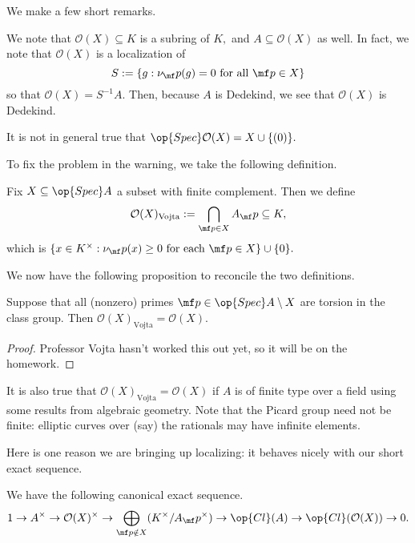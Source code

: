 \documentclass[../notes.tex]{subfiles}
\begin{document}
We make a few short remarks.
\begin{remark}
    We note that $\mathcal O(X)\subseteq K$ is a subring of $K,$ and $A\subseteq\mathcal O(X)$ as well. In fact, we note that $\mathcal O(X)$ is a localization of
    \[S:=\{g:\nu_\mf p(g)=0\text{ for all }\mf p\in X\}\]
    so that $\mathcal O(X)=S^{-1}A.$ Then, because $A$ is Dedekind, we see that $\mathcal O(X)$ is Dedekind.
\end{remark}
\begin{warn}
    It is not in general true that $\op{Spec}\mathcal O(X)=X\cup\{(0)\}.$
\end{warn}
To fix the problem in the warning, we take the following definition.
\begin{definition}
    Fix $X\subseteq\op{Spec}A$ a subset with finite complement. Then we define
    \[\mathcal O(X)_{\text{Vojta}}:=\bigcap_{\mf p\in X}A_\mf p\subseteq K,\]
    which is $\{x\in K^\times:\nu_\mf p(x)\ge0\text{ for each }\mf p\in X\}\cup\{0\}.$
\end{definition}
We now have the following proposition to reconcile the two definitions.
\begin{proposition}
    Suppose that all (nonzero) primes $\mf p\in\op{Spec}A\setminus X$ are torsion in the class group. Then $\mathcal O(X)_{\text{Vojta}}=\mathcal O(X).$
\end{proposition}
\begin{proof}
    Professor Vojta hasn't worked this out yet, so it will be on the homework.
\end{proof}
\begin{remark}
    It is also true that $\mathcal O(X)_{\text{Vojta}}=\mathcal O(X)$ if $A$ is of finite type over a field using some results from algebraic geometry. Note that the Picard group need not be finite: elliptic curves over (say) the rationals may have infinite elements.
\end{remark}
Here is one reason we are bringing up localizing: it behaves nicely with our short exact sequence.
\begin{proposition}
    We have the following canonical exact sequence.
    \[1\to A^\times\to\mathcal O(X)^\times\to\bigoplus_{\mf p\notin X}(K^\times/A_\mf p^\times)\to\op{Cl}(A)\to\op{Cl}(\mathcal O(X))\to0.\]
\end{proposition}
\end{document}
